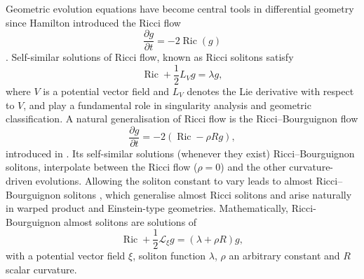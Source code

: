 \documentclass{article}
\theoremstyle{definition}
\theoremstyle{remark}
\begin{document}
Geometric evolution equations have become central tools in differential 
geometry since Hamilton introduced the Ricci flow
\[
\frac{\partial g}{\partial t} = -2\operatorname{Ric}(g)
\]
\cite{Hamilton1988}. Self-similar solutions of Ricci flow, known as 
Ricci solitons satisfy
\[
\operatorname{Ric} + \frac{1}{2} L_{V} g  = \lambda g,
\]
where $V$ is a potential vector field and  $L_V$ 
denotes the Lie derivative with respect to $V$,
and play a fundamental role in singularity analysis and geometric 
classification.
A natural generalisation of Ricci flow  is the Ricci--Bourguignon flow
\[
\frac{\partial g}{\partial t}
= -2(\operatorname{Ric} - \rho R g),
\]
introduced in \cite{CCD17}. Its self-similar solutions (whenever they exist)
Ricci--Bourguignon solitons,  interpolate between the Ricci flow 
($\rho=0$) and the other curvature-driven evolutions. 
Allowing the soliton constant to vary leads to almost 
Ricci--Bourguignon solitons \cite{SDRBS}, 
which generalise almost Ricci solitons and arise naturally 
in warped product and Einstein-type geometries.
Mathematically, Ricci-Bourguignon  almost solitons are 
solutions of 
\[
\operatorname{Ric} + \frac{1}{2}\mathcal{L}_\xi g = (\lambda + \rho R)g,
\]
with a potential vector field $\xi$, soliton function $\lambda$, $\rho$ 
an arbitrary constant and $R$ scalar curvature.  \\
\end{document}
